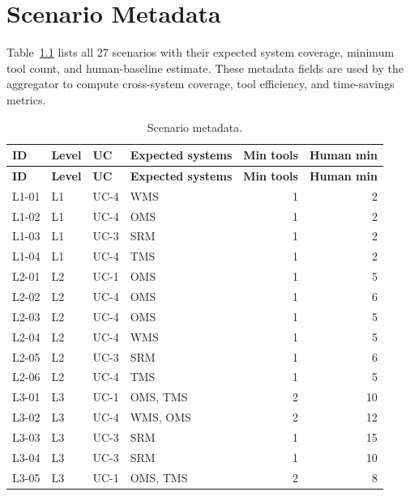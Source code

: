 
\chapter{Scenario Metadata}
\label{app:scenarios}

Table~\ref{tab:scenariosmeta} lists all 27 scenarios with their expected system coverage, minimum tool count, and human-baseline estimate. These metadata fields are used by the aggregator to compute cross-system coverage, tool efficiency, and time-savings metrics.

\begin{longtable}{@{}llllrr@{}}
\caption{Scenario metadata.}\label{tab:scenariosmeta}\\
\toprule
\textbf{ID} & \textbf{Level} & \textbf{UC} & \textbf{Expected systems} & \textbf{Min tools} & \textbf{Human min} \\
\midrule
\endfirsthead
\toprule
\textbf{ID} & \textbf{Level} & \textbf{UC} & \textbf{Expected systems} & \textbf{Min tools} & \textbf{Human min} \\
\midrule
\endhead
L1-01 & L1 & UC-4 & WMS               & 1 & 2  \\
L1-02 & L1 & UC-4 & OMS               & 1 & 2  \\
L1-03 & L1 & UC-3 & SRM               & 1 & 2  \\
L1-04 & L1 & UC-4 & TMS               & 1 & 2  \\
L2-01 & L2 & UC-1 & OMS               & 1 & 5  \\
L2-02 & L2 & UC-4 & OMS               & 1 & 6  \\
L2-03 & L2 & UC-4 & OMS               & 1 & 5  \\
L2-04 & L2 & UC-4 & WMS               & 1 & 5  \\
L2-05 & L2 & UC-3 & SRM               & 1 & 6  \\
L2-06 & L2 & UC-4 & TMS               & 1 & 5  \\
L3-01 & L3 & UC-1 & OMS, TMS          & 2 & 10 \\
L3-02 & L3 & UC-4 & WMS, OMS          & 2 & 12 \\
L3-03 & L3 & UC-3 & SRM               & 1 & 15 \\
L3-04 & L3 & UC-3 & SRM               & 1 & 10 \\
L3-05 & L3 & UC-1 & OMS, TMS          & 2 & 8  \\

\end{longtable}
